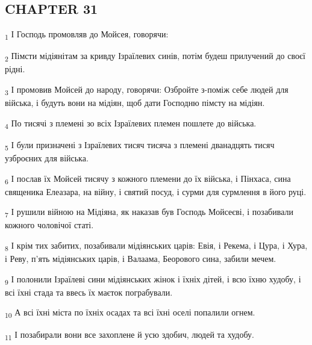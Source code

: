 \subsection{CHAPTER 31}
\begin{tcolorbox}
\textsubscript{1} І Господь промовляв до Мойсея, говорячи:
\end{tcolorbox}
\begin{tcolorbox}
\textsubscript{2} Пімсти мідіянітам за кривду Ізраїлевих синів, потім будеш прилучений до своєї рідні.
\end{tcolorbox}
\begin{tcolorbox}
\textsubscript{3} І промовив Мойсей до народу, говорячи: Озбройте з-поміж себе людей для війська, і будуть вони на мідіян, щоб дати Господню пімсту на мідіян.
\end{tcolorbox}
\begin{tcolorbox}
\textsubscript{4} По тисячі з племені зо всіх Ізраїлевих племен пошлете до війська.
\end{tcolorbox}
\begin{tcolorbox}
\textsubscript{5} І були призначені з Ізраїлевих тисяч тисяча з племені дванадцять тисяч узброєних для війська.
\end{tcolorbox}
\begin{tcolorbox}
\textsubscript{6} І послав їх Мойсей тисячу з кожного племени до їх війська, і Пінхаса, сина священика Елеазара, на війну, і святий посуд, і сурми для сурмлення в його руці.
\end{tcolorbox}
\begin{tcolorbox}
\textsubscript{7} І рушили війною на Мідіяна, як наказав був Господь Мойсеєві, і позабивали кожного чоловічої статі.
\end{tcolorbox}
\begin{tcolorbox}
\textsubscript{8} І крім тих забитих, позабивали мідіянських царів: Евія, і Рекема, і Цура, і Хура, і Реву, п'ять мідіянських царів, і Валаама, Беорового сина, забили мечем.
\end{tcolorbox}
\begin{tcolorbox}
\textsubscript{9} І полонили Ізраїлеві сини мідіянських жінок і їхніх дітей, і всю їхню худобу, і всі їхні стада та ввесь їх маєток пограбували.
\end{tcolorbox}
\begin{tcolorbox}
\textsubscript{10} А всі їхні міста по їхніх осадах та всі їхні оселі попалили огнем.
\end{tcolorbox}
\begin{tcolorbox}
\textsubscript{11} І позабирали вони все захоплене й усю здобич, людей та худобу.
\end{tcolorbox}
